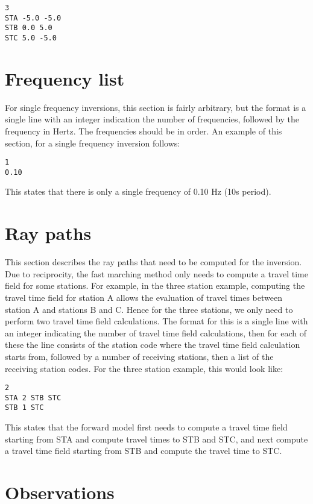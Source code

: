 \documentclass[a4paper,12pt]{article}
\begin{document}
\begin{verbatim}
3
STA -5.0 -5.0
STB 0.0 5.0
STC 5.0 -5.0
\end{verbatim}

\section{Frequency list}

For single frequency inversions, this section is fairly arbitrary, but
the format is a single line with an integer indication the number of
frequencies, followed by the frequency in Hertz. The frequencies
should be in order. An example of this section, for a single frequency
inversion follows:

\begin{verbatim}
1
0.10
\end{verbatim}

This states that there is only a single frequency of 0.10 Hz (10s period).

\section{Ray paths}

This section describes the ray paths that need to be computed for the
inversion. Due to reciprocity, the fast marching method only needs to
compute a travel time field for some stations. For example, in the
three station example, computing the travel time field for station A
allows the evaluation of travel times between station A and stations B
and C.  Hence for the three stations, we only need to perform two
travel time field calculations.  The format for this is a single line
with an integer indicating the number of travel time field
calculations, then for each of these the line consists of the station
code where the travel time field calculation starts from, followed by
a number of receiving stations, then a list of the receiving station
codes. For the three station example, this would look like:

\begin{verbatim}
2
STA 2 STB STC
STB 1 STC
\end{verbatim}

This states that the forward model first needs to compute a travel
time field starting from STA and compute travel times to STB and STC,
and next compute a travel time field starting from STB and compute the
travel time to STC.

\section{Observations}
\end{document}
